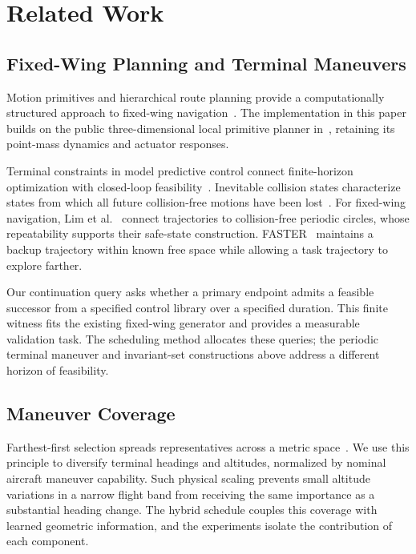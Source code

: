 \section{Related Work}
\subsection{Fixed-Wing Planning and Terminal Maneuvers}
Motion primitives and hierarchical route planning provide a computationally structured approach to fixed-wing navigation~\cite{tan2022twophase,tan2026twophase}. The implementation in this paper builds on the public three-dimensional local primitive planner in~\cite{hkpolyu2026code}, retaining its point-mass dynamics and actuator responses.

Terminal constraints in model predictive control connect finite-horizon optimization with closed-loop feasibility~\cite{mayne2000mpc}. Inevitable collision states characterize states from which all future collision-free motions have been lost~\cite{fraichard2004ics}. For fixed-wing navigation, Lim et al.~\cite{lim2024safe} connect trajectories to collision-free periodic circles, whose repeatability supports their safe-state construction. FASTER~\cite{tordesillas2022faster} maintains a backup trajectory within known free space while allowing a task trajectory to explore farther.

Our continuation query asks whether a primary endpoint admits a feasible successor from a specified control library over a specified duration. This finite witness fits the existing fixed-wing generator and provides a measurable validation task. The scheduling method allocates these queries; the periodic terminal maneuver and invariant-set constructions above address a different horizon of feasibility.



\subsection{Maneuver Coverage}
Farthest-first selection spreads representatives across a metric space~\cite{gonzalez1985clustering}. We use this principle to diversify terminal headings and altitudes, normalized by nominal aircraft maneuver capability. Such physical scaling prevents small altitude variations in a narrow flight band from receiving the same importance as a substantial heading change. The hybrid schedule couples this coverage with learned geometric information, and the experiments isolate the contribution of each component.
